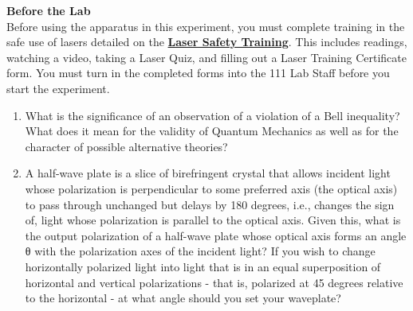 \documentclass{../signatures}
\begin{document}
\maketitle

\names

\textbf{Before the Lab}
\\[12pt]
Before using the apparatus in this experiment, you must complete training in the safe use of lasers detailed on the \href{http://experimentationlab.berkeley.edu/lasersafety}{\textbf{Laser Safety Training}}. This includes readings, watching a video, taking a Laser Quiz, and filling out a Laser Training Certificate form. You must turn in the completed forms into the 111 Lab Staff before you start the experiment.
\\[32pt]
\prelab

\begin{enumerate}

    \item What is the significance of an observation of a violation of a Bell inequality? What does it mean for the validity of Quantum Mechanics as well as for the character of possible alternative theories?
    
    \item A half-wave plate is a slice of birefringent crystal that allows incident light whose polarization is perpendicular to some preferred axis (the optical axis) to pass through unchanged but delays by 180 degrees, i.e., changes the sign of, light whose polarization is parallel to the optical axis. Given this, what is the output polarization of a half-wave plate whose optical axis forms an angle θ with the polarization axes of the incident light? If you wish to change horizontally polarized light into light that is in an equal superposition of horizontal and vertical polarizations - that is, polarized at 45 degrees relative to the horizontal - at what angle should you set your waveplate?


\end{enumerate}
\end{document}
